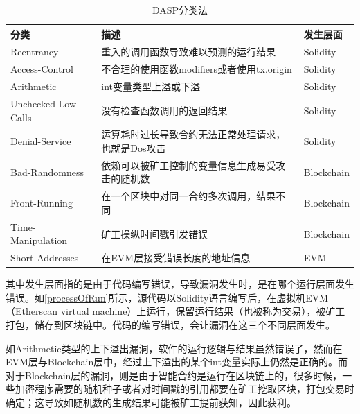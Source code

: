 \begin{table}[htbp]
\centering
\begin{footnotesize}

\begin{tabular}{@{}lll@{}}
\toprule
{\color[HTML]{494949} 分类} & {\color[HTML]{494949} 描述}                               & {\color[HTML]{494949} 发生层面} \\ \midrule
Reentrancy                      & 重入的调用函数导致难以预测的运行结果 & Solidity                     \\
Access-Control                  & 不合理的使用函数modifiers或者使用tx.origin          & Solidity                     \\
Arithmetic                      & int变量类型上溢或下溢                                    & Solidity                     \\
Unchecked-Low-Calls         & 没有检查函数调用的返回结果                             & Solidity                     \\
Denial-Service               & 运算耗时过长导致合约无法正常处理请求，也就是Dos攻击   & Solidity                     \\
Bad-Randomness                  & 依赖可以被矿工控制的变量信息生成易受攻击的随机数          & Blockchain                   \\
Front-Running                   & 在一个区块中对同一合约多次调用，结果不同  & Blockchain                   \\
Time-Manipulation               & 矿工操纵时间戳引发错误                           & Blockchain                   \\
Short-Addresses                   & 在EVM层接受错误长度的地址信息        & EVM                          \\ \bottomrule
\end{tabular}
\end{footnotesize}
\caption{DASP分类法}
\label{DASP}
\end{table}%

其中发生层面指的是由于代码编写错误，导致漏洞发生时，是在哪个运行层面发生错误。如\ref{processOfRun}所示，源代码以Solidity语言编写后，在虚拟机EVM（Etherscan virtual machine）上运行，保留运行结果（也被称为交易），被矿工打包，储存到区块链中。代码的编写错误，会让漏洞在这三个不同层面发生。

如Arithmetic类型的上下溢出漏洞，软件的运行逻辑与结果虽然错误了，然而在EVM层与Blockchain层中，经过上下溢出的某个int变量实际上仍然是正确的。而对于Blockchain层的漏洞，则是由于智能合约是运行在区块链上的，很多时候，一些加密程序需要的随机种子或者对时间戳的引用都要在矿工挖取区块，打包交易时确定；这导致如随机数的生成结果可能被矿工提前获知，因此获利。

